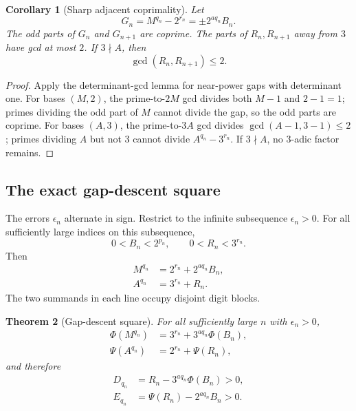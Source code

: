 \documentclass[11pt]{article}
\newtheorem{theorem}{Theorem}[section]
\newtheorem{corollary}[theorem]{Corollary}
\theoremstyle{definition}
\begin{document}
\begin{corollary}[Sharp adjacent coprimality]\label{cor:adjacent-coprime}
Let
\[
 G_n=M^{q_n}-2^{r_n}
     =\pm2^{aq_n}B_n.
\]
The odd parts of \(G_n\) and \(G_{n+1}\) are coprime.  The parts of
\(R_n,R_{n+1}\) away from \(3\) have gcd at most \(2\).  If \(3\nmid A\),
then
\begin{equation}\label{eq:R-gcd2}
 \gcd(R_n,R_{n+1})\le2.
\end{equation}
\end{corollary}

\begin{proof}
Apply the determinant-gcd lemma for near-power gaps with determinant one.
For bases \((M,2)\), the prime-to-\(2M\) gcd divides both \(M-1\) and
\(2-1=1\); primes dividing the odd part of \(M\) cannot divide the gap, so
the odd parts are coprime.  For bases \((A,3)\), the prime-to-\(3A\) gcd
divides \(\gcd(A-1,3-1)\le2\); primes dividing \(A\) but not \(3\) cannot
divide \(A^{q_n}-3^{r_n}\).  If \(3\nmid A\), no 3-adic factor remains.
\end{proof}

\subsection{The exact gap-descent square}

The errors \(\epsilon_n\) alternate in sign.  Restrict to the infinite
subsequence \(\epsilon_n>0\).  For all sufficiently large indices on this
subsequence,
\begin{equation}\label{eq:gap-small}
 0<B_n<2^{p_n},
 \qquad
 0<R_n<3^{r_n}.
\end{equation}
Then
\begin{align}
 M^{q_n}&=2^{r_n}+2^{aq_n}B_n,
 \label{eq:M-gap-decomp}\\
 A^{q_n}&=3^{r_n}+R_n.
 \label{eq:A-gap-decomp}
\end{align}
The two summands in each line occupy disjoint digit blocks.

\begin{theorem}[Gap-descent square]\label{thm:gap-descent}
For all sufficiently large \(n\) with \(\epsilon_n>0\),
\begin{align}
 \Phi(M^{q_n})
 &=3^{r_n}+3^{aq_n}\Phi(B_n),
 \label{eq:Phi-gap-decomp}\\
 \Psi(A^{q_n})
 &=2^{r_n}+\Psi(R_n),
 \label{eq:Psi-gap-decomp}
\end{align}
and therefore
\begin{align}
 D_{q_n}
 &=R_n-3^{aq_n}\Phi(B_n)>0,
 \label{eq:D-gap-descent}\\
 E_{q_n}
 &=\Psi(R_n)-2^{aq_n}B_n>0.
 \label{eq:E-gap-descent}
\end{align}
\end{theorem}
\end{document}
